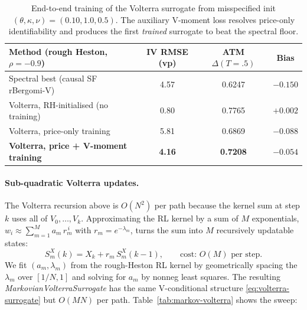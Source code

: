 \documentclass[11pt,a4paper]{article}
\begin{document}
\begin{table}[h]
\centering
\caption{End-to-end training of the Volterra surrogate from misspecified
init $(\theta, \kappa, \nu) = (0.10, 1.0, 0.5)$. The auxiliary V-moment
loss resolves price-only identifiability and produces the first
\emph{trained} surrogate to beat the spectral floor.}
\label{tab:volterra-trained}
\begin{tabular}{lccc}
\toprule
Method (rough Heston, $\rho=-0.9$) & IV RMSE (vp) & ATM $\Delta(T=.5)$ & Bias \\
\midrule
Spectral best (causal SF rBergomi-V)    & 4.57 & 0.6247 & $-0.150$ \\
Volterra, RH-initialised (no training)   & 0.80 & 0.7765 & $+0.002$ \\
Volterra, price-only training        & 5.81 & 0.6869 & $-0.088$ \\
\textbf{Volterra, price + V-moment training} & \textbf{4.16} & \textbf{0.7208} & \textbf{$-0.054$} \\
\bottomrule
\end{tabular}
\end{table}

\paragraph{Sub-quadratic Volterra updates.}
The Volterra recursion above is $O(N^2)$ per path because the kernel
sum at step $k$ uses all of $V_0, \ldots, V_k$. Approximating the RL
kernel by a sum of $M$ exponentials,
$w_i \approx \sum_{m=1}^{M} a_m\, r_m^{\,i}$ with $r_m = e^{-\lambda_m}$,
turns the sum into $M$ recursively updatable states:
\begin{equation}
 S_m^X(k) = X_k + r_m\, S_m^X(k-1),
 \qquad \text{cost: } O(M) \text{ per step.}
 \label{eq:markov-state}
\end{equation}
We fit $(a_m, \lambda_m)$ from the rough-Heston RL kernel by
geometrically spacing the $\lambda_m$ over $[1/N, 1]$ and solving for
$a_m$ by nonneg least squares. The resulting
\emph{MarkovianVolterraSurrogate} has the same V-conditional structure
\eqref{eq:volterra-surrogate} but $O(MN)$ per path.
Table~\ref{tab:markov-volterra} shows the sweep:
\end{document}

